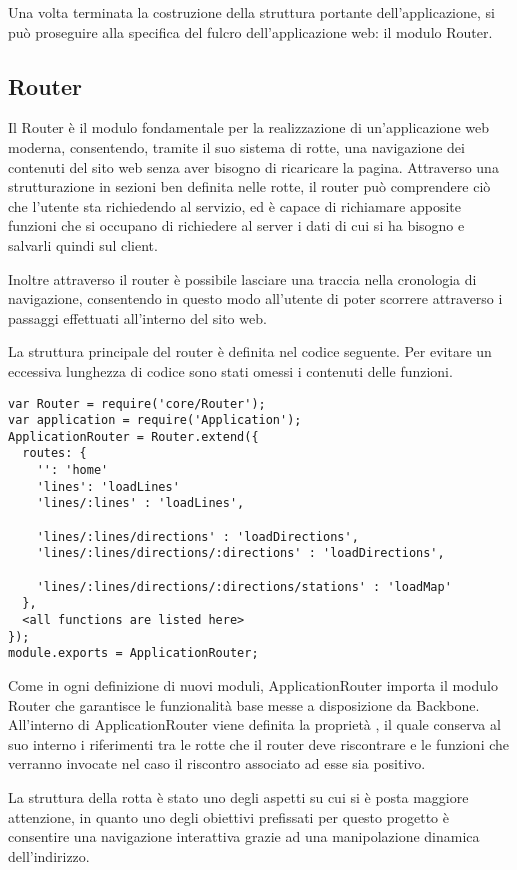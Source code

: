 Una volta terminata la costruzione della struttura portante dell'applicazione, si può proseguire alla specifica del fulcro dell'applicazione web: il modulo Router.

\subsection{Router} %
\label{sub:router}

Il Router è il modulo fondamentale per la realizzazione di un'applicazione web moderna, consentendo, tramite il suo sistema di rotte, una navigazione dei contenuti del sito web senza aver bisogno di ricaricare la pagina.
Attraverso una strutturazione in sezioni ben definita nelle rotte, il router può comprendere ciò che l'utente sta richiedendo al servizio, ed è capace di richiamare apposite funzioni che si occupano di richiedere al server i dati di cui si ha bisogno e salvarli quindi sul client.

Inoltre attraverso il router è possibile lasciare una traccia nella cronologia di navigazione, consentendo in questo modo all'utente di poter scorrere attraverso i passaggi effettuati all'interno del sito web.

La struttura principale del router è definita nel codice seguente. Per evitare un eccessiva lunghezza di codice sono stati omessi i contenuti delle funzioni.
{\small
\begin{verbatim}
var Router = require('core/Router');
var application = require('Application');
ApplicationRouter = Router.extend({
  routes: {
    '': 'home'
    'lines': 'loadLines'
    'lines/:lines' : 'loadLines',

    'lines/:lines/directions' : 'loadDirections',
    'lines/:lines/directions/:directions' : 'loadDirections',

    'lines/:lines/directions/:directions/stations' : 'loadMap'
  },
  <all functions are listed here>
});
module.exports = ApplicationRouter;
\end{verbatim}
}
\newpage
Come in ogni definizione di nuovi moduli, ApplicationRouter importa il modulo Router che garantisce le funzionalità base messe a disposizione da Backbone. 
All'interno di ApplicationRouter viene definita la proprietà , il quale conserva al suo interno i riferimenti tra le rotte che il router deve riscontrare e le funzioni che verranno invocate nel caso il riscontro associato ad esse sia positivo.

La struttura della rotta è stato uno degli aspetti su cui si è posta maggiore attenzione, in quanto uno degli obiettivi prefissati per questo progetto è consentire una navigazione interattiva grazie ad una manipolazione dinamica dell'indirizzo.

